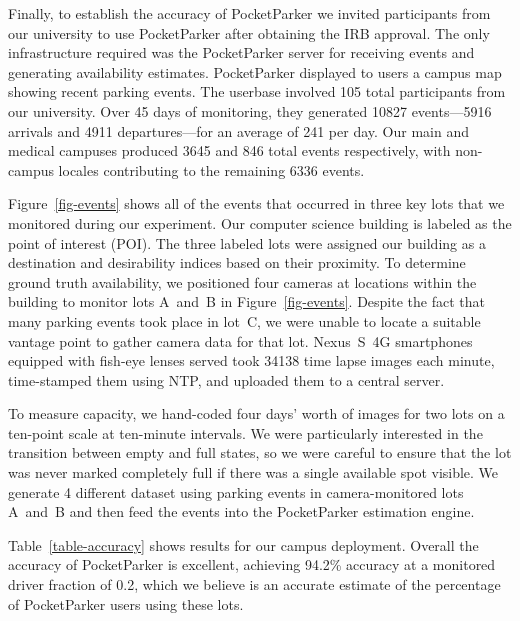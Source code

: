 Finally, to establish the accuracy of PocketParker we invited participants
from our university to use PocketParker after obtaining the IRB approval. The
only infrastructure required was the PocketParker server for receiving events
and generating availability estimates.  PocketParker displayed to users a
campus map showing recent parking events. The userbase involved 105 total
participants from our university.  Over 45 days of monitoring, they generated
\num{10827} events---5916 arrivals and 4911 departures---for an average of
241 per day. Our main and medical campuses produced 3645 and 846 total events
respectively, with non-campus locales contributing to the remaining 6336
events.

Figure~\ref{fig-events} shows all of the events that occurred in three key
lots that we monitored during our experiment. Our computer science building
is labeled as the point of interest (POI). The three labeled lots were
assigned our building as a destination and desirability indices based on
their proximity. To determine ground truth availability, we positioned four
cameras at locations within the building to monitor lots A~and~B in
Figure~\ref{fig-events}. Despite the fact that many parking events took place
in lot~C, we were unable to locate a suitable vantage point to gather camera
data for that lot. Nexus~S~4G smartphones equipped with fish-eye lenses
served took \num{34138} time lapse images each minute, time-stamped them
using NTP, and uploaded them to a central server.

To measure capacity, we hand-coded four days' worth of images for two lots on
a ten-point scale at ten-minute intervals. We were particularly interested
in the transition between empty and full states, so we were careful to ensure
that the lot was never marked completely full if there was a single available
spot visible. We generate 4 different dataset using parking events in 
camera-monitored lots A~and~B and then feed the events into the PocketParker
estimation engine.

Table~\ref{table-accuracy} shows results for our campus deployment. Overall
the accuracy of PocketParker is excellent, achieving 94.2\% accuracy at a
monitored driver fraction of 0.2, which we believe is an accurate estimate of
the percentage of PocketParker users using these lots.
